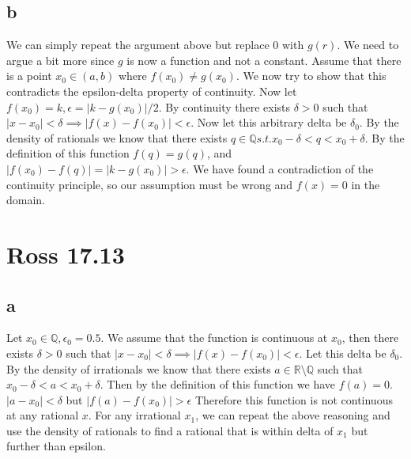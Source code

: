 \documentclass[12pt]{article}
\newcommand{\R}{\mathbb{R}}
\newcommand{\Q}{\mathbb{Q}}
\begin{document}
\subsection{b}
We can simply repeat the argument above but replace $0$ with $g(r)$. We need to argue a bit more since $g$ is now a function and not a constant.
\newline
Assume that there is a point $x_0 \in (a,b)$ where $f(x_0) \not= g(x_0)$. We now try to show that this contradicts the epsilon-delta property of continuity.
\newline
Now let $f(x_0) = k, \epsilon = |k-g(x_0)|/2$. By continuity there exists $\delta > 0$ such that $|x-x_0|<\delta \implies |f(x)-f(x_0)|<\epsilon$. Now let this arbitrary delta be $\delta_0$. By the density of rationals we know that there exists $q \in \Q s.t. x_0-\delta < q < x_0+\delta$. By the definition of this function $f(q)=g(q)$, and $|f(x_0)-f(q)|=|k-g(x_0)| > \epsilon$. \lightning
\newline
We have found a contradiction of the continuity principle, so our assumption must be wrong and $f(x) = 0$ in the domain.
\newpage


\section{Ross 17.13}

\subsection{a}
Let $x_0 \in \Q, \epsilon_0 = 0.5$. We assume that the function is continuous at $x_0$, then there exists $\delta > 0$ such that $|x-x_0|<\delta \implies |f(x)-f(x_0)|<\epsilon$. Let this delta be $\delta_0$. By the density of irrationals we know that there exists $a \in \R \setminus \Q$ such that $x_0-\delta < a < x_0+\delta$. Then by the definition of this function we have $f(a)=0$. $|a-x_0|<\delta$ but $|f(a)-f(x_0)|>\epsilon$ \lightning
\newline
Therefore this function is not continuous at any rational $x$.
\newline
For any irrational $x_1$, we can repeat the above reasoning and use the density of rationals to find a rational that is within delta of $x_1$ but further than epsilon.
\end{document}
